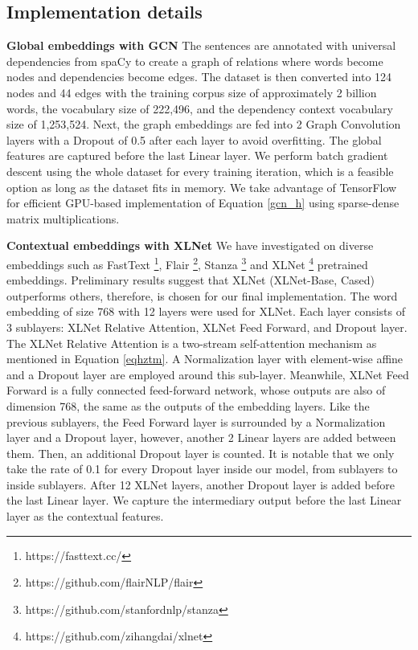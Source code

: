 \documentclass[runningheads]{llncs}
\begin{document}
\subsection{Implementation details}
\noindent\textbf{Global embeddings with GCN}
The sentences are annotated with universal dependencies from spaCy to create a graph of relations where words become nodes and dependencies become edges. The dataset is then converted into 124 nodes and 44 edges with the training corpus size of approximately 2 billion words, the vocabulary size of 222,496, and the dependency context vocabulary size of 1,253,524. Next, the graph embeddings are fed into 2 Graph Convolution layers with a Dropout of 0.5 after each layer to avoid overfitting. The global features are captured before the last Linear layer. We perform batch gradient descent using the whole dataset for every training iteration, which is a feasible option as long as the dataset fits in memory. We take advantage of TensorFlow for efficient GPU-based implementation of Equation \ref{gcn_h} using sparse-dense matrix multiplications. 

\noindent\textbf{Contextual embeddings with XLNet}
We have investigated on diverse embeddings such as FastText \cite{mikolov2018advances} \footnote{https://fasttext.cc/}, Flair \cite{akbik2019flair} \footnote{https://github.com/flairNLP/flair}, Stanza \cite{qi2020stanza} \footnote{https://github.com/stanfordnlp/stanza} and XLNet \cite{yang2019xlnet} \footnote{https://github.com/zihangdai/xlnet} pretrained embeddings. Preliminary results suggest that XLNet (XLNet-Base, Cased) outperforms others, therefore, is chosen for our final implementation. The word embedding of size 768 with 12 layers were used for XLNet. Each layer consists of 3 sublayers: XLNet Relative Attention, XLNet Feed Forward, and Dropout layer. The XLNet Relative Attention is a two-stream self-attention mechanism as mentioned in Equation \ref{eqhztm}. A Normalization layer with element-wise affine and a Dropout layer are employed around this sub-layer. Meanwhile, XLNet Feed Forward is a fully connected feed-forward network, whose outputs are also of dimension 768, the same as the outputs of the embedding layers. Like the previous sublayers, the Feed Forward layer is surrounded by a Normalization layer and a Dropout layer, however, another 2 Linear layers are added between them. Then, an additional Dropout layer is counted. It is notable that we only take the rate of 0.1 for every Dropout layer inside our model, from sublayers to inside sublayers.  After 12 XLNet layers, another Dropout layer is added before the last Linear layer. We capture the intermediary output before the last Linear layer as the contextual features. 
\end{document}
